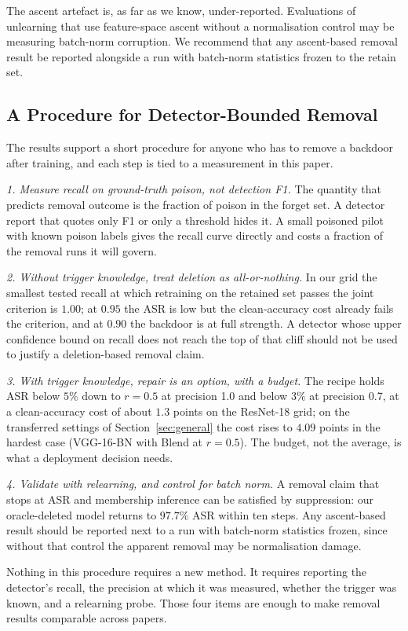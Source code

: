 The ascent artefact is, as far as we know, under-reported. Evaluations of
unlearning that use feature-space ascent without a normalisation control may be
measuring batch-norm corruption. We recommend that any ascent-based removal
result be reported alongside a run with batch-norm statistics frozen to the
retain set.

\subsection{A Procedure for Detector-Bounded Removal}
The results support a short procedure for anyone who has to remove a backdoor
after training, and each step is tied to a measurement in this paper.

\emph{1. Measure recall on ground-truth poison, not detection F1.} The quantity
that predicts removal outcome is the fraction of poison in the forget set. A
detector report that quotes only F1 or only a threshold hides it. A small
poisoned pilot with known poison labels gives the recall curve directly and costs
a fraction of the removal runs it will govern.

\emph{2. Without trigger knowledge, treat deletion as all-or-nothing.} In our
grid the smallest tested recall at which retraining on the retained set passes
the joint criterion is $1.00$; at $0.95$ the ASR is low but the clean-accuracy
cost already fails the criterion, and at $0.90$ the backdoor is at full strength.
A detector whose upper confidence bound on recall does not reach the top of that
cliff should not be used to justify a deletion-based removal claim.

\emph{3. With trigger knowledge, repair is an option, with a budget.} The recipe
holds ASR below $5\%$ down to $r{=}0.5$ at precision 1.0 and below $3\%$ at
precision 0.7, at a clean-accuracy cost of about $1.3$ points on the ResNet-18
grid; on the transferred settings of Section~\ref{sec:general} the cost rises to
$4.09$ points in the hardest case (VGG-16-BN with Blend at $r{=}0.5$). The
budget, not the average, is what a deployment decision needs.

\emph{4. Validate with relearning, and control for batch norm.} A removal claim
that stops at ASR and membership inference can be satisfied by suppression: our
oracle-deleted model returns to $97.7\%$ ASR within ten steps. Any ascent-based
result should be reported next to a run with batch-norm statistics frozen, since
without that control the apparent removal may be normalisation damage.

Nothing in this procedure requires a new method. It requires reporting the
detector's recall, the precision at which it was measured, whether the trigger
was known, and a relearning probe. Those four items are enough to make removal
results comparable across papers.

